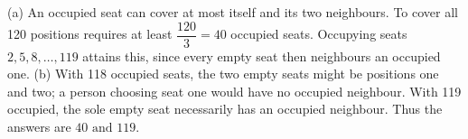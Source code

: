 (a) An occupied seat can cover at most itself and its two neighbours. To cover all 120 positions requires at least $\dfrac{120}{3}=40$ occupied seats. Occupying seats $2,5,8,\ldots,119$ attains this, since every empty seat then neighbours an occupied one.
(b) With 118 occupied seats, the two empty seats might be positions one and two; a person choosing seat one would have no occupied neighbour. With 119 occupied, the sole empty seat necessarily has an occupied neighbour. Thus the answers are $\boxed{40\text{ and }119}$.
